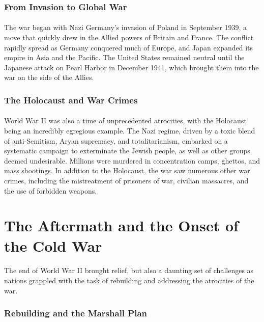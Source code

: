 \documentclass{book}
\begin{document}
\subsubsection*{From Invasion to Global War}
\paragraph{}
The war began with Nazi Germany’s invasion of Poland in September 1939, a move that quickly drew in the Allied powers of Britain and France. The conflict rapidly spread as Germany conquered much of Europe, and Japan expanded its empire in Asia and the Pacific. The United States remained neutral until the Japanese attack on Pearl Harbor in December 1941, which brought them into the war on the side of the Allies. 

\subsubsection*{The Holocaust and War Crimes}
\paragraph{}
World War II was also a time of unprecedented atrocities, with the Holocaust being an incredibly egregious example. The Nazi regime, driven by a toxic blend of anti-Semitism, Aryan supremacy, and totalitarianism, embarked on a systematic campaign to exterminate the Jewish people, as well as other groups deemed undesirable. Millions were murdered in concentration camps, ghettos, and mass shootings. In addition to the Holocaust, the war saw numerous other war crimes, including the mistreatment of prisoners of war, civilian massacres, and the use of forbidden weapons. 

\section*{The Aftermath and the Onset of the Cold War}
\paragraph{}
The end of World War II brought relief, but also a daunting set of challenges as nations grappled with the task of rebuilding and addressing the atrocities of the war.

\subsubsection*{Rebuilding and the Marshall Plan}
\end{document}
